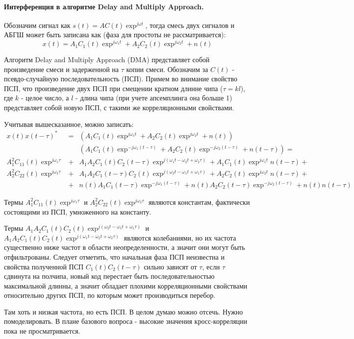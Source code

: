 \documentclass[a4paper,12pt]{scrartcl} %
\begin{document}
\paragraph{Интерференция в алгоритме Delay and Multiply Approach.}

Обозначим сигнал как ${s(t)=A C(t) \exp^{j \omega t}}$, тогда смесь двух сигналов и АБГШ может быть записана как (фаза для простоты не рассматривается):
\begin{equation}
	x(t) = A_1 C_1(t) \exp^{j \omega_1 t} + A_2 C_2(t) \exp^{j \omega_2 t} + n(t)
\end{equation}

Алгоритм Delay and Multiply Approach (DMA) представляет собой произведение смеси и задерженной на ${\tau}$ копии смеси. Обозначим за ${C(t)}$ - псевдо-случайную
последовательность (ПСП). Примем во внимание свойство ПСП, что произведение двух ПСП при смещении кратном длинне чипа (${\tau = kl}$), где ${k}$ - целое число,
а ${l}$ - длина чипа (при учете апсемплинга она больше 1) представляет собой новую ПСП, с такими же корреляционными свойствами.

Учитывая вышесказанное, можно записать:
\begin{eqnarray}
	x(t)x(t-\tau)^* & = & 	\left( A_1 C_1(t) \exp^{j \omega_1 t} + A_2 C_2(t) \exp^{j \omega_2 t} + n(t) \right) \\
		        &   &	\left( A_1 C_1(t) \exp^{-j \omega_1 (t-\tau)} + A_2 C_2(t) \exp^{-j \omega_2 (t-\tau)} + n(t-\tau) \right)  =  \nonumber  \\
	 A_1^2 C_{11}(t)\exp^{j \omega_1 \tau} & + & A_1 A_2 C_1(t)C_2(t-\tau) \exp^{j(\omega_1 t - \omega_2 t + \omega_2 \tau)} + A_1 C_1(t)\exp^{j \omega_1 t} n(t-\tau) + \nonumber \\
	 A_2^2 C_{22}(t)\exp^{j \omega_2 \tau} & + & A_1 A_2 C_1(t-\tau)C_2(t) \exp^{j(\omega_2 t - \omega_1 t + \omega_1 \tau)} + A_2 C_2(t) \exp^{j \omega_2 t}n(t-\tau) + \nonumber \\
			& + & n(t) A_1 C_1(t-\tau)\exp^{-j \omega_1 (t-\tau)} + n(t) A_2 C_2(t-\tau)\exp^{-j \omega_2 (t-\tau)} + n(t)n(t-\tau) \nonumber
\end{eqnarray}

Термы ${A_1^2 C_{11}(t)\exp^{j \omega_1 \tau}}$ и ${A_2^2 C_{22}(t)\exp^{j \omega_2 \tau}}$ являются константам, фактически состоящими из ПСП, умноженного на константу.

Термы ${A_1 A_2 C_1(t)C_2(t) \exp^{j(\omega_2 t - \omega_1 t + \omega_1 \tau)}}$ и ${A_1 A_2 C_1(t)C_2(t) \exp^{j(\omega_1 t - \omega_2 t + \omega_2 \tau)}}$ являются
колебаниями, но их частота существенно ниже частот в области неопределенности, а значит они могут быть отфильтрованы. Следует отметить, что начальная фаза ПСП неизвестна
и свойства полученной ПСП ${C_1(t)C_2(t-\tau)}$ сильно зависят от ${\tau}$, если ${\tau}$ сдвинута на полчипа, новый код перестает быть последовательностью максимальной длинны,
а значит обладает плохими корреляционными свойствами относительно других ПСП, по которым может производиться перебор.

Там хоть и низкая частота, но есть ПСП. В целом думаю можно отсечь. Нужно помоделировать. В плане базового вопроса - высокие значения кросс-корреляции пока не просматривается.
\end{document}
